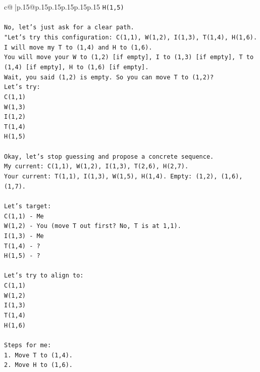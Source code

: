 \documentclass{article}
\begin{document}
{\begin{supertabular}{c@{$\;$}|p{.15\linewidth}@{}p{.15\linewidth}p{.15\linewidth}p{.15\linewidth}p{.15\linewidth}p{.15\linewidth}}
{{{\texttt{H(1,5)} \\
\\ 
\texttt{No, let's just ask for a clear path.} \\
\texttt{"Let's try this configuration: C(1,1), W(1,2), I(1,3), T(1,4), H(1,6).} \\
\texttt{I will move my T to (1,4) and H to (1,6).} \\
\texttt{You will move your W to (1,2) {[}if empty{]}, I to (1,3) {[}if empty{]}, T to (1,4) {[}if empty{]}, H to (1,6) {[}if empty{]}.} \\
\texttt{Wait, you said (1,2) is empty. So you can move T to (1,2)?} \\
\texttt{Let's try:} \\
\texttt{C(1,1)} \\
\texttt{W(1,3)} \\
\texttt{I(1,2)} \\
\texttt{T(1,4)} \\
\texttt{H(1,5)} \\
\\ 
\texttt{Okay, let's stop guessing and propose a concrete sequence.} \\
\texttt{My current: C(1,1), W(1,2), I(1,3), T(2,6), H(2,7).} \\
\texttt{Your current: T(1,1), I(1,3), W(1,5), H(1,4). Empty: (1,2), (1,6), (1,7).} \\
\\ 
\texttt{Let's target:} \\
\texttt{C(1,1) {-} Me} \\
\texttt{W(1,2) {-} You (move T out first? No, T is at 1,1).} \\
\texttt{I(1,3) {-} Me} \\
\texttt{T(1,4) {-} ?} \\
\texttt{H(1,5) {-} ?} \\
\\ 
\texttt{Let's try to align to:} \\
\texttt{C(1,1)} \\
\texttt{W(1,2)} \\
\texttt{I(1,3)} \\
\texttt{T(1,4)} \\
\texttt{H(1,6)} \\
\\ 
\texttt{Steps for me:} \\
\texttt{1. Move T to (1,4).} \\
\texttt{2. Move H to (1,6).} \\
\\ 
}}}
\end{supertabular}}
\end{document}
